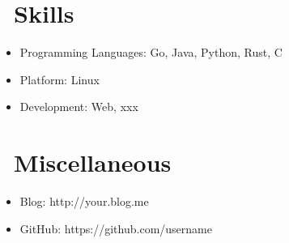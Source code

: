 \documentclass{resume}
\begin{document}

\section{\faCogs\ Skills}
\begin{itemize}[parsep=0.5ex]
  \item Programming Languages: Go, Java, Python, Rust, C
  \item Platform: Linux
  \item Development: Web, xxx
\end{itemize}

\section{\faInfo\ Miscellaneous}
\begin{itemize}[parsep=0.5ex]
  \item Blog: http://your.blog.me
  \item GitHub: https://github.com/username
\end{itemize}
\end{document}

